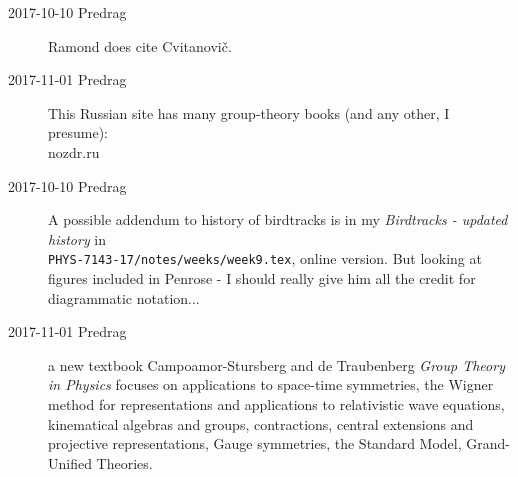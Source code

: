 \begin{description}
\item[2017-10-10  Predrag]
Ramond does cite Cvitanovi\v{c}.

\item[2017-11-01 Predrag]
This Russian site has many group-theory books (and any other, I presume):\\
 {nozdr.ru}


\item[2017-10-10  Predrag]
A possible addendum to history of birdtracks is in my
{\em Birdtracks - updated history} in\\
\texttt{PHYS-7143-17/notes/weeks/week9.tex},
{online version}.
But looking at figures included in Penrose - I should
really give him all the credit for diagrammatic notation...

\item[2017-11-01  Predrag] a new textbook
Campoamor-Stursberg and de Traubenberg
{\em Group Theory in Physics} focuses on applications to space-time symmetries,
the Wigner method for representations and applications to relativistic wave
equations, kinematical algebras and groups, contractions, central extensions and
projective representations, Gauge symmetries, the Standard Model, Grand-Unified
Theories.

\end{description}


\printbibliography[heading=subbibintoc,title={References}]
